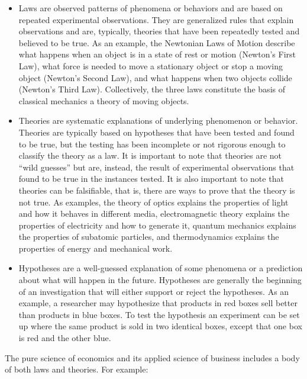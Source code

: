 \begin{itemize}
	\item Laws are observed patterns of phenomena or behaviors and are based on repeated experimental observations. They are generalized rules that explain observations and are, typically, theories that have been repeatedly tested and believed to be true. As an example, the Newtonian Laws of Motion describe what happens when an object is in a state of rest or motion (Newton's First Law), what force is needed to move a stationary object or stop a moving object (Newton's Second Law), and what happens when two objects collide (Newton's Third Law). Collectively, the three laws constitute the basis of classical mechanics \textemdash \; a theory of moving objects. 
	\item Theories are systematic explanations of underlying phenomenon or behavior. Theories are typically based on hypotheses that have been tested and found to be true, but the testing has been incomplete or not rigorous enough to classify the theory as a law. It is important to note that theories are not ``wild guesses'' but are, instead, the result of experimental observations that found to be true in the instances tested. It is also important to note that theories can be falsifiable, that is, there are ways to prove that the theory is not true. As examples, the theory of optics explains the properties of light and how it behaves in different media, electromagnetic theory explains the properties of electricity and how to generate it, quantum mechanics explains the properties of subatomic particles, and thermodynamics explains the properties of energy and mechanical work. 
	\item Hypotheses are a well-guessed explanation of some phenomena or a prediction about what will happen in the future. Hypotheses are generally the beginning of an investigation that will either support or reject the hypotheses. As an example, a researcher may hypothesize that products in red boxes sell better than products in blue boxes. To test the hypothesis an experiment can be set up where the same product is sold in two identical boxes, except that one box is red and the other blue.
\end{itemize}

The pure science of economics and its applied science of business includes a body of both laws and theories. For example:

